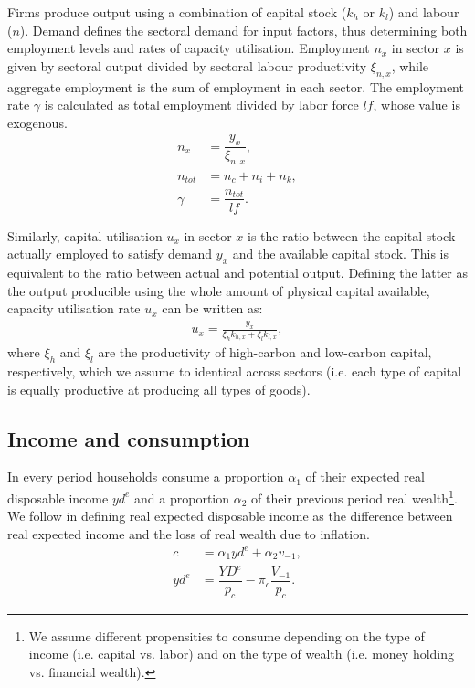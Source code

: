 \documentclass[authoryear]{article}
\begin{document}
Firms produce output using a combination of capital stock ($k_h$ or $k_l$) and labour ($n$). Demand defines the sectoral demand for input factors, thus determining both employment levels and rates of capacity utilisation. Employment $n_x$ in sector $x$ is given by sectoral output divided by sectoral labour productivity $\xi_{n,x}$, while aggregate employment is the sum of employment in each sector. The employment rate $\gamma$ is calculated as total employment divided by labor force $lf$, whose value is exogenous.
\begin{align}
n_x&=\dfrac{y_x}{\xi_{n,x}}, \\
n_{tot} &= n_c + n_i + n_k, \\
\gamma&=\dfrac{n_{tot}}{lf}.
\end{align}

Similarly, capital utilisation $u_x$ in sector $x$ is the ratio between the capital stock actually employed to satisfy demand $y_x$ and the available capital stock. This is equivalent to the ratio between actual and potential output. Defining the latter as the output producible using the whole amount of physical capital available, capacity utilisation rate $u_x$ can be written as:
\begin{gather}
u_x = \frac{y_x}{\xi_{h} k_{h,x} + \xi_{l} k_{l,x}},
\end{gather}
where $\xi_{h}$ and $\xi_{l}$ are the productivity of high-carbon and low-carbon capital, respectively, which we assume to identical across sectors (i.e. each type of capital is equally productive at producing all types of goods). 

\subsection{Income and consumption}
\label{sec:income}

In every period households consume a proportion $\alpha_1$ of their expected real disposable income $yd^e$ and a proportion $\alpha_2$ of their previous period real wealth\footnote{We assume different propensities to consume depending on the type of income (i.e. capital vs. labor) and on the type of wealth (i.e. money holding vs. financial wealth).}. We follow \citet{Godley:2007} in defining real expected disposable income as the difference between real expected income and the loss of real wealth due to inflation.
\begin{align}
c&=\alpha_1 yd^e + \alpha_2 v_{-1},\\
yd^e&=\dfrac{YD^e}{p_c}-\pi_c \dfrac{V_{-1}}{p_c}.
\end{align}
\end{document}
